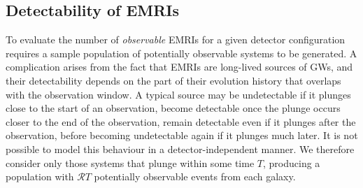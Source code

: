 
\subsection{Detectability of EMRIs}
\label{sec:EMRI-detectability}
To evaluate the number of \emph{observable} EMRIs for a given detector configuration requires a sample population of potentially observable systems to be generated. A complication arises from the fact that EMRIs are long-lived sources of GWs, and their detectability depends on the part of their evolution history that overlaps with the observation window. A typical source may be undetectable if it plunges close to the start of an observation, become detectable once the plunge occurs closer to the end of the observation, remain detectable even if it plunges after the observation, before becoming undetectable again if it plunges much later. It is not possible to model this behaviour in a detector-independent manner. We therefore consider only those systems that plunge within some time $T$, producing a population with $\mathcal{R}T$ potentially observable events from each galaxy.

